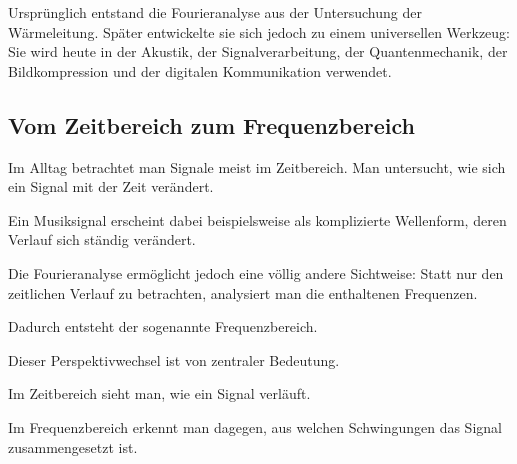 Ursprünglich entstand die Fourieranalyse aus der Untersuchung der Wärmeleitung.
Später entwickelte sie sich jedoch zu einem universellen Werkzeug:
Sie wird heute in der Akustik, der Signalverarbeitung, der Quantenmechanik,
der Bildkompression und der digitalen Kommunikation verwendet.

\subsection{Vom Zeitbereich zum Frequenzbereich}

Im Alltag betrachtet man Signale meist im Zeitbereich.
Man untersucht,
wie sich ein Signal mit der Zeit verändert.

Ein Musiksignal erscheint dabei beispielsweise
als komplizierte Wellenform,
deren Verlauf sich ständig verändert.

Die Fourieranalyse ermöglicht jedoch eine völlig andere Sichtweise:
Statt nur den zeitlichen Verlauf zu betrachten,
analysiert man die enthaltenen Frequenzen.

Dadurch entsteht der sogenannte Frequenzbereich.

\medskip

Dieser Perspektivwechsel ist von zentraler Bedeutung.

Im Zeitbereich sieht man,
wie ein Signal verläuft.

Im Frequenzbereich erkennt man dagegen,
aus welchen Schwingungen das Signal zusammengesetzt ist.

